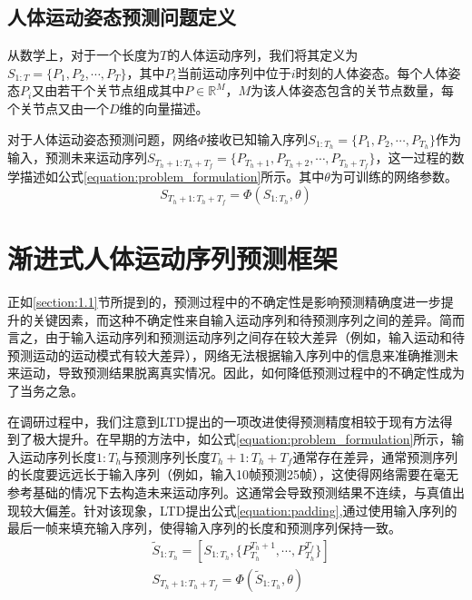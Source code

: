 \subsection{人体运动姿态预测问题定义}
从数学上，对于一个长度为$T$的人体运动序列，我们将其定义为$S_{1:T} = \{P_1,P_2,\cdots,P_{T}\}$，其中$P_i$当前运动序列中位于$i$时刻的人体姿态。每个人体姿态$P_i$又由若干个关节点组成其中$P \in \mathbb{R}^M$，$M$为该人体姿态包含的关节点数量，每个关节点又由一个$D$维的向量描述。

对于人体运动姿态预测问题，网络$\Phi$接收已知输入序列$S_{1:T_h} = \{P_1,P_2,\cdots,P_{T_h}\}$作为输入，预测未来运动序列$S_{T_h+1:T_h+T_f} = \{P_{T_h+1},P_{T_h+2},\cdots,P_{T_h+T_f}\}$，这一过程的数学描述如公式\ref{equation:problem_formulation}所示。其中$\theta$为可训练的网络参数。
\begin{equation}
    S_{T_h+1:T_h+T_f} = \Phi(S_{1:T_h}, \theta) \label{equation:problem_formulation}
\end{equation}

\section{渐进式人体运动序列预测框架}
正如\ref{section:1.1}节所提到的，预测过程中的不确定性是影响预测精确度进一步提升的关键因素，而这种不确定性来自输入运动序列和待预测序列之间的差异。简而言之，由于输入运动序列和预测运动序列之间存在较大差异（例如，输入运动和待预测运动的运动模式有较大差异），网络无法根据输入序列中的信息来准确推测未来运动，导致预测结果脱离真实情况。因此，如何降低预测过程中的不确定性成为了当务之急。

在调研过程中，我们注意到LTD\parencite{mao2019learning}提出的一项改进使得预测精度相较于现有方法得到了极大提升。在早期的方法中，如公式\ref{equation:problem_formulation}所示，输入运动序列长度$1:T_h$与预测序列长度$T_h+1:T_h+T_f$通常存在差异，通常预测序列的长度要远远长于输入序列（例如，输入10帧预测25帧），这使得网络需要在毫无参考基础的情况下去构造未来运动序列。这通常会导致预测结果不连续，与真值出现较大偏差。针对该现象，LTD\parencite{mao2019learning}提出公式\ref{equation:padding},通过使用输入序列的最后一帧来填充输入序列，使得输入序列的长度和预测序列保持一致。
\begin{equation}
    \begin{aligned}
        &\widetilde{S}_{1:T_h} = [S_{1:T_h}, \{P^{T_h+1}_{T_h}, \cdots, P^{T_f}_{T_h} \} ]
        \\
        &S_{T_h+1:T_h+T_f} = \Phi(\widetilde{S}_{1:T_h}, \theta)
    \end{aligned}
    \label{equation:padding}
\end{equation}

